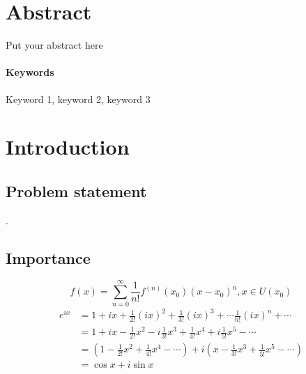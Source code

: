 \documentclass{senior-design}
\begin{document}
\setcounter{page}{1}
\individualreportcover  %
\section*{Abstract}
Put your abstract here

\paragraph{Keywords}
Keyword 1, keyword 2, keyword 3
\clearpage
\tableofcontents
\clearpage

\setcounter{page}{1}
\section{Introduction}
\subsection{Problem statement}
\lipsum[1]\cite{li1999,haynes1951}.
\subsection{Importance}
\begin{equation}
    f\left( x \right) =\sum_{n=0}^{\infty}{\frac{1}{n!}f^{\left( n \right)}\left( x_0 \right) \left( x-x_0 \right) ^n}, x\in U\left( x_0 \right)
\end{equation}
\begin{equation}
    \begin{aligned}
    e^{ix}&=1+ix+\frac{1}{2!}\left( ix \right) ^2+\frac{1}{3!}\left( ix \right) ^3+\cdots \frac{1}{n!}\left( ix \right) ^n+\cdots
    \\
    &=1+ix-\frac{1}{2!}x^2-i\frac{1}{3!}x^3+\frac{1}{4!}x^4+i\frac{1}{5!}x^5-\cdots
    \\
    &=\left( 1-\frac{1}{2!}x^2+\frac{1}{4!}x^4-\cdots \right) +i\left( x-\frac{1}{3!}x^3+\frac{1}{5!}x^5-\cdots \right)
    \\
    &=\cos x+i\sin x
    \end{aligned}
\end{equation}
\end{document}
